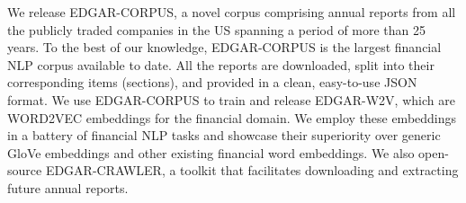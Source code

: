 We release EDGAR-CORPUS, a novel corpus comprising annual reports from all the publicly traded companies in the US spanning a period of more than 25 years. To the best of our knowledge, EDGAR-CORPUS is the largest financial NLP corpus available to date. All the reports are downloaded, split into their corresponding items (sections), and provided in a clean, easy-to-use JSON format. We use EDGAR-CORPUS to train and release EDGAR-W2V, which are WORD2VEC embeddings for the financial domain. We employ these embeddings in a battery of financial NLP tasks and showcase their superiority over generic GloVe embeddings and other existing financial word embeddings. We also open-source EDGAR-CRAWLER, a toolkit that facilitates downloading and extracting future annual reports.
